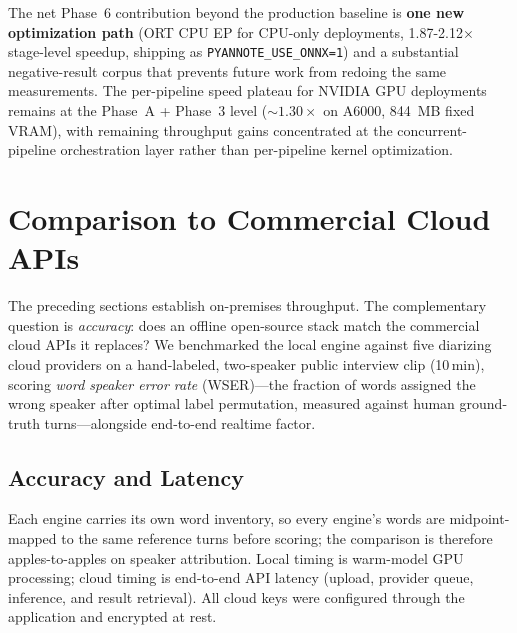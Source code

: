 \documentclass[conference,10pt]{IEEEtran}
\begin{document}
The net Phase~6 contribution beyond the production baseline is
\textbf{one new optimization path} (ORT CPU EP for CPU-only deployments,
1.87-2.12$\times$ stage-level speedup, shipping as \texttt{PYANNOTE\_USE\_ONNX=1})
and a substantial negative-result corpus that prevents future work from
redoing the same measurements. The per-pipeline speed plateau for
NVIDIA GPU deployments remains at the Phase~A + Phase~3 level
($\sim 1.30\times$ on A6000, 844~MB fixed VRAM), with remaining throughput
gains concentrated at the concurrent-pipeline orchestration layer rather
than per-pipeline kernel optimization.

\section{Comparison to Commercial Cloud APIs}

The preceding sections establish on-premises throughput. The complementary
question is \emph{accuracy}: does an offline open-source stack match the
commercial cloud APIs it replaces? We benchmarked the local engine against five
diarizing cloud providers on a hand-labeled, two-speaker public interview clip
(10\,min), scoring \emph{word speaker error rate} (WSER)---the fraction of words
assigned the wrong speaker after optimal label permutation, measured against
human ground-truth turns---alongside end-to-end realtime factor.

\subsection{Accuracy and Latency}

Each engine carries its own word inventory, so every engine's words are
midpoint-mapped to the same reference turns before scoring; the comparison is
therefore apples-to-apples on speaker attribution. Local timing is warm-model GPU
processing; cloud timing is end-to-end API latency (upload, provider queue,
inference, and result retrieval). All cloud keys were configured through the
application and encrypted at rest.
\end{document}
